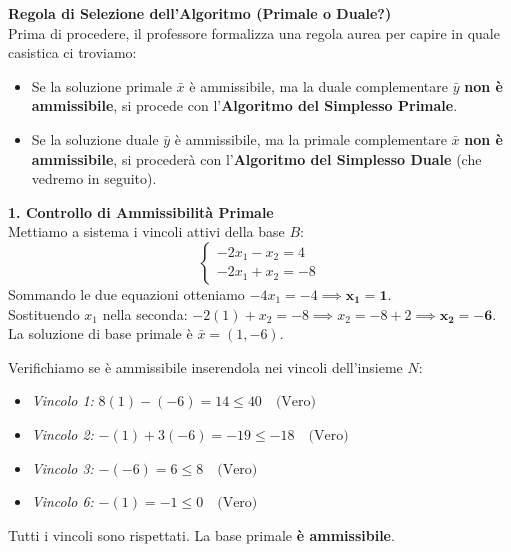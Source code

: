 \documentclass[12pt, a4paper]{article}
\begin{document}
	\vspace{0.4cm}
	\textbf{Regola di Selezione dell'Algoritmo (Primale o Duale?)}\\
	Prima di procedere, il professore formalizza una regola aurea per capire in quale casistica ci troviamo:
	\begin{itemize}[label=\textcolor{titlecolor}{\Large\textbullet}, itemsep=2pt, leftmargin=1.5cm]
		\item Se la soluzione primale $\bar{x}$ è ammissibile, ma la duale complementare $\bar{y}$ \textbf{non è ammissibile}, si procede con l'\textbf{Algoritmo del Simplesso Primale}.
		\item Se la soluzione duale $\bar{y}$ è ammissibile, ma la primale complementare $\bar{x}$ \textbf{non è ammissibile}, si procederà con l'\textbf{Algoritmo del Simplesso Duale} (che vedremo in seguito).
	\end{itemize}
	
	\vspace{0.4cm}
	\textbf{1. Controllo di Ammissibilità Primale}\\
	Mettiamo a sistema i vincoli attivi della base $B$:
	\[
	\begin{cases}
		-2x_1 - x_2 = 4 \\
		-2x_1 + x_2 = -8
	\end{cases}
	\]
	Sommando le due equazioni otteniamo $-4x_1 = -4 \implies \mathbf{x_1 = 1}$. \\
	Sostituendo $x_1$ nella seconda: $-2(1) + x_2 = -8 \implies x_2 = -8 + 2 \implies \mathbf{x_2 = -6}$.\\
	La soluzione di base primale è $\bar{x} = (1, -6)$. 
	
	Verifichiamo se è ammissibile inserendola nei vincoli dell'insieme $N$:
	\begin{itemize}[label=$\circ$, itemsep=2pt, leftmargin=1.5cm]
		\item \textit{Vincolo 1:} $8(1) - (-6) = 14 \leq 40 \quad \text{(Vero)}$
		\item \textit{Vincolo 2:} $-(1) + 3(-6) = -19 \leq -18 \quad \text{(Vero)}$
		\item \textit{Vincolo 3:} $-(-6) = 6 \leq 8 \quad \text{(Vero)}$
		\item \textit{Vincolo 6:} $-(1) = -1 \leq 0 \quad \text{(Vero)}$
	\end{itemize}
	Tutti i vincoli sono rispettati. La base primale \textbf{è ammissibile}.
	
\end{document}
